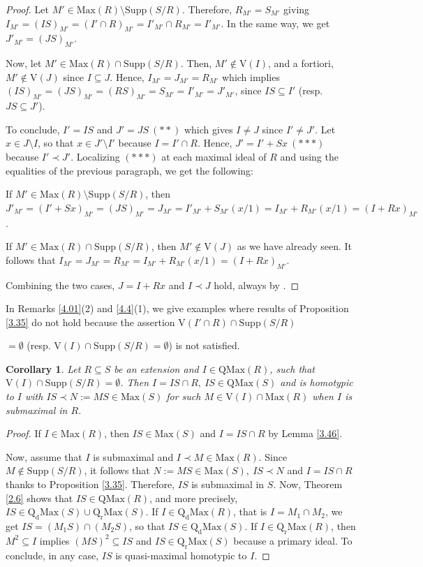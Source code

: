 \documentclass[12pt,leqno]{amsart}
\newtheorem{corollary}[theorem]{Corollary}
\theoremstyle{definition}
\begin{document}
\begin{proof}
Let $M'\in\mathrm{Max}(R)\setminus\mathrm{Supp}(S/R)$. Therefore, $R_ {M'}=S_{M'}$ giving $I_{M'}=(IS)_{M'}=(I'\cap R)_{M'}=I'_{M'}\cap R_{M'}=I' _{M'}$. In the same way, we get $J'_{M'}=(JS)_{M'}$. 

Now, let $M'\in\mathrm{Max}(R)\cap\mathrm{Supp}(S/R)$. Then, $M'\not\in\mathrm{V}(I)$, and a fortiori, $M'\not\in\mathrm{V}(J)$ since $I\subseteq J$. Hence, $I_{M'}=J_{M'}=R_{M'}$ which implies $(IS)_{M'}=(J S)_{M'}=(RS)_{M'}=S_{M'}=I'_{M'}=J'_{M'}$, since $IS\subseteq I'$ (resp.  $ JS\subseteq J'$). 

To conclude, $I'=IS$ and $J'=JS\ (**)$ which gives $I\neq J$ since $I'\neq J'$. Let $x\in J\setminus I$, so that $x\in J'\setminus I'$ because $I=I'\cap R$. Hence, $J'=I'+Sx\ (***)$ because $I'\prec J'$. Localizing $(***)$ at each maximal ideal of $R$ and using the equalities of the previous paragraph, we get the following:
 
If $M'\in\mathrm{Max}(R)\setminus\mathrm{Supp}(S/R)$, then $J'_{M'}=(I'+ Sx)_{M'}=(JS)_{M'}=J_{M'}=I'_{M'}+S_{M'}(x/1)=I_{M'}+R_{M'}(x/1)=(I+Rx)_ {M'}$.
  
If $M'\in\mathrm{Max}(R)\cap\mathrm{Supp}(S/R)$, then $M'\not\in\mathrm{V}(J)$ as we have already seen. It follows that $I_{M'}=J_{M'}=R_{M'}=I_{M'}+R_{M'}(x/1)=(I+Rx)_{M'}$.
 
Combining the two cases, $J=I+Rx$ and $I\prec J$ hold, always by \cite[Corollary 1, p. 237]{ZS}.
\end{proof}

In Remarks \ref{4.01}(2) and \ref{4.4}(1), we give examples where results of Proposition \ref{3.35} do not hold because the assertion $\mathrm{V}(I'\cap R)\cap\mathrm{Supp}(S/R)$

\noindent$=\emptyset$ (resp. $\mathrm{V}(I)\cap\mathrm{Supp}(S/R)=\emptyset$) is not satisfied. 

\begin{corollary}\label{3.3} Let $R\subseteq S$ be an extension and $I\in\mathrm{QMax}(R)$, such that $\mathrm{V}(I)\cap\mathrm{Supp}(S/R)=\emptyset$. Then $I=IS\cap R,\ IS\in\mathrm{QMax}(S)$ and is homotypic to $I$ with $IS\prec N:=MS\in\mathrm{Max}(S)$ for such $M\in\mathrm{V}(I)\cap \mathrm{Max}(R)$ when $I$ is submaximal in $R$.
\end{corollary}
\begin{proof} If $I\in\mathrm{Max}(R)$, then $IS\in\mathrm{Max}(S)$ and $I=IS\cap R$ by Lemma \ref{3.46}. 

Now, assume that $I$ is submaximal and $I\prec M\in\mathrm{Max}(R)$. Since $M\not\in\mathrm{Supp}(S/R)$, it follows that $N:=MS\in\mathrm {Max}(S),\ IS\prec N$ and $I=IS\cap R$ thanks to Proposition \ref{3.35}. Therefore, $IS$ is submaximal in $S$. Now, Theorem \ref{2.6} shows that $IS\in\mathrm{QMax}(R)$, and more precisely, $IS\in\mathrm{Q_dMax}(S)\cup\mathrm{Q_rMax}(S)$. If $I\in\mathrm{Q_dMax}(R)$, that is $I=M_1 \cap M_2$, we get $IS=(M_1S)\cap(M_2S)$, so that $IS\in\mathrm {Q_dMax}(S)$. If $I\in\mathrm{Q_rMax}(R)$, then $M^2\subseteq I$ implies $(MS)^2\subseteq IS$ and $IS\in\mathrm{Q_rMax}(S)$ because a primary ideal. To conclude, in any case, $IS$ is quasi-maximal homotypic to $I$.  
\end{proof}
\end{document}
